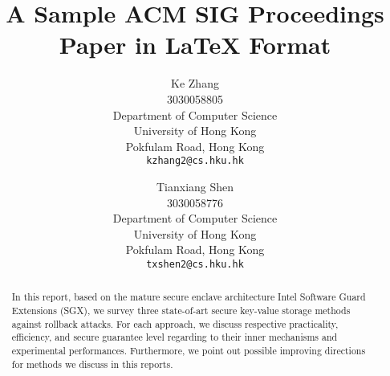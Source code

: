 \documentclass{acm_proc_article-csis8101}
\begin{document}
%

\title{A Sample {\ttlit ACM} SIG Proceedings Paper in LaTeX
Format}
%

\author{
Ke Zhang\\
3030058805\\
Department of Computer Science\\
University of Hong Kong \\
Pokfulam Road, Hong Kong\\
\texttt{kzhang2@cs.hku.hk}
\and Tianxiang Shen\\
3030058776\\
Department of Computer Science\\
University of Hong Kong \\
Pokfulam Road, Hong Kong \\
\texttt{txshen2@cs.hku.hk}
}

%
\maketitle
\begin{abstract}
In this report, based on the mature secure enclave architecture Intel Software Guard Extensions (SGX), we survey three state-of-art secure key-value storage methods against rollback attacks. For each approach, we discuss respective practicality, efficiency, and secure guarantee level regarding to their inner mechanisms and experimental performances. Furthermore, we point out possible improving directions for methods we discuss in this reports.

\end{abstract}







% 



%

\newpage


\end{document}
